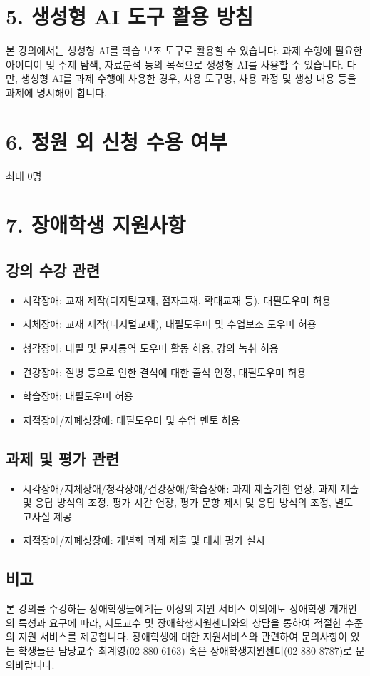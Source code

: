 \documentclass{article}
\begin{document}
\newpage
\section{5. 생성형 AI 도구 활용 방침}
\medskip
본 강의에서는 생성형 AI를 학습 보조 도구로 활용할 수 있습니다. 과제 수행에 필요한 아이디어 및 주제 탐색, 자료분석 등의 목적으로 생성형 AI를 사용할 수 있습니다. 다만, 생성형 AI를 과제 수행에 사용한 경우, 사용 도구명, 사용 과정 및 생성 내용 등을 과제에 명시해야 합니다.

\section{6. 정원 외 신청 수용 여부}
\medskip
최대 0명

\section{7. 장애학생 지원사항}
\medskip
\subsection{강의 수강 관련}
\medskip
\begin{itemize}
    \item 시각장애: 교재 제작(디지털교재, 점자교재, 확대교재 등), 대필도우미 허용
    \item 지체장애: 교재 제작(디지털교재), 대필도우미 및 수업보조 도우미 허용
    \item 청각장애: 대필 및 문자통역 도우미 활동 허용, 강의 녹취 허용
    \item 건강장애: 질병 등으로 인한 결석에 대한 출석 인정, 대필도우미 허용
    \item 학습장애: 대필도우미 허용
    \item 지적장애/자폐성장애: 대필도우미 및 수업 멘토 허용
\end{itemize}
\subsection{과제 및 평가 관련}
\medskip
\begin{itemize}
    \item 시각장애/지체장애/청각장애/건강장애/학습장애: 과제 제출기한 연장, 과제 제출 및 응답 방식의 조정, 평가 시간 연장, 평가 문항 제시 및 응답 방식의 조정, 별도 고사실 제공
    \item 지적장애/자폐성장애: 개별화 과제 제출 및 대체 평가 실시
\end{itemize}
\subsection{비고}
\medskip
본 강의를 수강하는 장애학생들에게는 이상의 지원 서비스 이외에도 장애학생 개개인의 특성과 요구에 따라, 지도교수 및 장애학생지원센터와의 상담을 통하여 적절한 수준의 지원 서비스를 제공합니다. 장애학생에 대한 지원서비스와 관련하여 문의사항이 있는 학생들은 담당교수 최계영(02-880-6163) 혹은 장애학생지원센터(02-880-8787)로 문의바랍니다.
\end{document}
